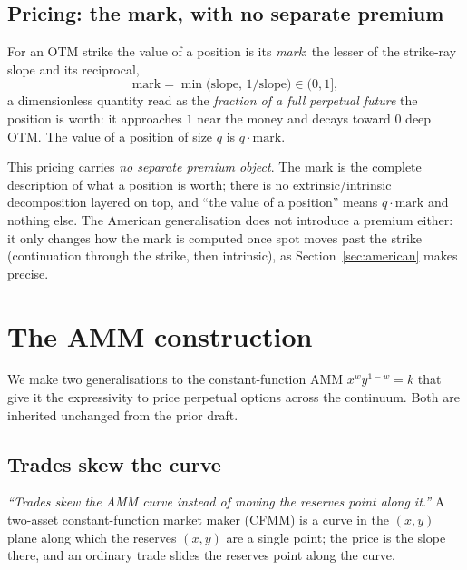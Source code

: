 \documentclass[runningheads]{llncs}
\begin{document}
\subsection{Pricing: the mark, with no separate premium}
For an OTM strike the value of a position is its \emph{mark}: the lesser of the
strike-ray slope and its reciprocal,
\begin{equation}
  \mathrm{mark}=\min\!\bigl(\mathrm{slope},\,1/\mathrm{slope}\bigr)\in(0,1],
  \label{eq:mark}
\end{equation}
a dimensionless quantity read as the \emph{fraction of a full perpetual future}
the position is worth: it approaches $1$ near the money and decays toward $0$
deep OTM. The value of a position of size $q$ is $q\cdot\mathrm{mark}$.

This pricing carries \emph{no separate premium object}. The mark is the complete
description of what a position is worth; there is no extrinsic/intrinsic
decomposition layered on top, and ``the value of a position'' means
$q\cdot\mathrm{mark}$ and nothing else. The American generalisation does not
introduce a premium either: it only changes how the mark is computed once spot
moves past the strike (continuation through the strike, then intrinsic), as
Section~\ref{sec:american} makes precise.

\section{The AMM construction}\label{sec:amm}

We make two generalisations to the constant-function AMM $x^{w}y^{1-w}=k$ that
give it the expressivity to price perpetual options across the continuum. Both
are inherited unchanged from the prior draft.

\subsection{Trades skew the curve}
\emph{``Trades skew the AMM curve instead of moving the reserves point along
it.''} A two-asset constant-function market maker (CFMM) is a curve in the
$(x,y)$ plane along which the reserves $(x,y)$ are a single point; the price is
the slope there, and an ordinary trade slides the reserves point along the curve.
\end{document}
